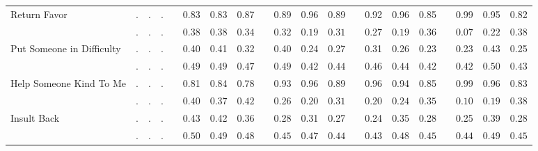 \begin{landscape}
\begin{center}
{\begin{longtable}{L{5cm} c c c p{.5cm} c c c p{.5cm} c c c p{.5cm} c c c p{.5cm} c c c}
Return Favor & . &         . &         . & &      0.83 &      0.83 &      0.87 & &      0.89 &      0.96 &      0.89 & &      0.92 &      0.96 &      0.85 & &      0.99 &      0.95 &      0.82 \\*
& $\mathit{        .}$ & $\mathit{        .}$ & $\mathit{        .}$ & & $\mathit{     0.38}$ & $\mathit{     0.38}$ & $\mathit{     0.34}$ & & $\mathit{     0.32}$ & $\mathit{     0.19}$ & $\mathit{     0.31}$ & & $\mathit{     0.27}$ & $\mathit{     0.19}$ & $\mathit{     0.36}$ & & $\mathit{     0.07}$ & $\mathit{     0.22}$ & $\mathit{     0.38}$ \\[1.6em]
Put Someone in Difficulty & . &         . &         . & &      0.40 &      0.41 &      0.32 & &      0.40 &      0.24 &      0.27 & &      0.31 &      0.26 &      0.23 & &      0.23 &      0.43 &      0.25 \\*
& $\mathit{        .}$ & $\mathit{        .}$ & $\mathit{        .}$ & & $\mathit{     0.49}$ & $\mathit{     0.49}$ & $\mathit{     0.47}$ & & $\mathit{     0.49}$ & $\mathit{     0.42}$ & $\mathit{     0.44}$ & & $\mathit{     0.46}$ & $\mathit{     0.44}$ & $\mathit{     0.42}$ & & $\mathit{     0.42}$ & $\mathit{     0.50}$ & $\mathit{     0.43}$ \\[1.6em]
Help Someone Kind To Me & . &         . &         . & &      0.81 &      0.84 &      0.78 & &      0.93 &      0.96 &      0.89 & &      0.96 &      0.94 &      0.85 & &      0.99 &      0.96 &      0.83 \\*
& $\mathit{        .}$ & $\mathit{        .}$ & $\mathit{        .}$ & & $\mathit{     0.40}$ & $\mathit{     0.37}$ & $\mathit{     0.42}$ & & $\mathit{     0.26}$ & $\mathit{     0.20}$ & $\mathit{     0.31}$ & & $\mathit{     0.20}$ & $\mathit{     0.24}$ & $\mathit{     0.35}$ & & $\mathit{     0.10}$ & $\mathit{     0.19}$ & $\mathit{     0.38}$ \\[1.6em]
Insult Back & . &         . &         . & &      0.43 &      0.42 &      0.36 & &      0.28 &      0.31 &      0.27 & &      0.24 &      0.35 &      0.28 & &      0.25 &      0.39 &      0.28 \\*
& $\mathit{        .}$ & $\mathit{        .}$ & $\mathit{        .}$ & & $\mathit{     0.50}$ & $\mathit{     0.49}$ & $\mathit{     0.48}$ & & $\mathit{     0.45}$ & $\mathit{     0.47}$ & $\mathit{     0.44}$ & & $\mathit{     0.43}$ & $\mathit{     0.48}$ & $\mathit{     0.45}$ & & $\mathit{     0.44}$ & $\mathit{     0.49}$ & $\mathit{     0.45}$ \\[1.6em]
\hline
\end{longtable}
}
\end{center}
\end{landscape}
